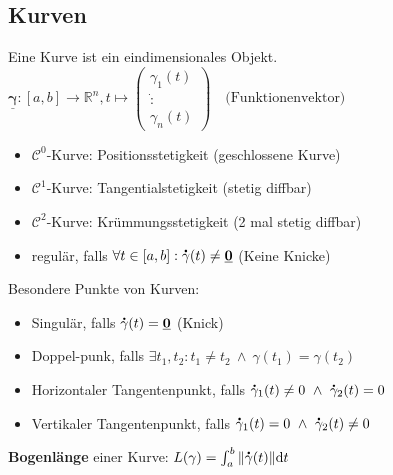 \documentclass[6pt,a4paper]{scrartcl}
\let\olddot = \dot
\newcommand{\norm}[1]{\ensuremath{\|#1\|}}														%
\newcommand{\svdots}{\ensuremath{\olddot :}}													%
\renewcommand{\vec}[1]{\ensuremath{\underline{\boldsymbol {#1}}}}								%
\renewcommand{\emph}[1]{\textbf{#1}}															%
\renewcommand*{\dot}[1]{\accentset{\mbox{\textrm{\large\bfseries .}} }{#1}}						%
\begin{document}
\begin{multicols}{4}
\section{Kurven}
Eine Kurve ist ein eindimensionales Objekt.\\
$ \vec \gamma:[a,b] \rightarrow \mathbb R^n, t \mapsto \begin{pmatrix} \gamma_1(t) \\ \svdots \\ \gamma_n(t) \end{pmatrix} \quad \text{(Funktionenvektor)} $
\begin{itemize}\itemsep-2pt
	\item $\mathcal C^0$-Kurve: Positionsstetigkeit (geschlossene Kurve)
	\item $\mathcal C^1$-Kurve: Tangentialstetigkeit (stetig diffbar)
	\item $\mathcal C^2$-Kurve: Krümmungsstetigkeit (2 mal stetig diffbar)
	\item regulär, falls $\forall t \in [a,b]:\dot \gamma(t) \ne \vec 0$ (Keine Knicke)
\end{itemize}
Besondere Punkte von Kurven:
\begin{itemize}\itemsep-2pt
	\item Singulär, falls $\dot \gamma(t)=\vec 0$ (Knick)
	\item Doppel-punk, falls $\exists t_1,t_2:t_1 \ne t_2 \ \land \ \gamma(t_1)=\gamma(t_2)$
	\item Horizontaler Tangentenpunkt, falls $\dot \gamma_1(t) \ne 0 \ \land \ \dot \gamma_2(t)=0$
	\item Vertikaler Tangentenpunkt, falls $\dot \gamma_1(t) = 0 \ \land \ \dot \gamma_2(t) \ne 0$
\end{itemize}
\emph{Bogenlänge} einer Kurve: $L(\gamma) = \int_{a}^{b} \norm{\dot \gamma(t)} \mathrm dt$ \\



\end{multicols}
\end{document}
